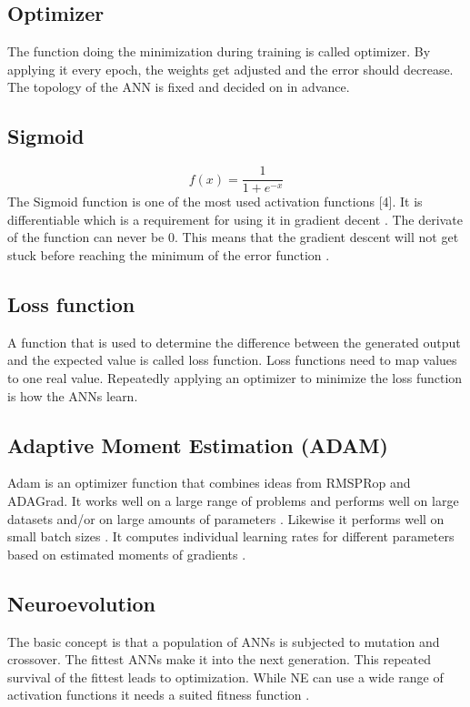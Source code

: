 \documentclass{llncs}
\begin{document}
\subsection{Optimizer}
%
The function doing the minimization during training is called optimizer. By applying it every epoch, the weights get adjusted and the error should decrease. The topology of the ANN is fixed and decided on in advance.
%
\subsection{Sigmoid}
%
$$ f (x) =  \frac{\mathrm{1} }{\mathrm{1} + e^{-x} }  $$ 
\newline
The Sigmoid function is one of the most used activation functions [4]. It is differentiable which is a requirement for using it in gradient decent \cite{Rojas.1996}. The derivate of the function can never be 0. This means that the gradient descent will not get stuck before reaching the minimum of the error function \cite{Rojas.1996}.  
%
\subsection{Loss function}
%
A function that is used to determine the difference between the generated output and the expected value is called loss function. Loss functions need to map values to one real value. Repeatedly applying an optimizer to minimize the loss function is how the ANNs learn.
%
\subsection{Adaptive Moment Estimation (ADAM)}
%
Adam is an optimizer function that combines ideas from RMSPRop and ADAGrad. It works well on a large range of problems and performs well on large datasets and/or on large amounts of parameters \cite{Kingma.22.12.2014}. Likewise it performs well on small batch sizes \cite{Kingma.22.12.2014}. It computes individual learning rates for different parameters based on estimated moments of gradients \cite{Kingma.22.12.2014}.
%
\subsection{Neuroevolution }
%
The basic concept is that a population of ANNs is subjected to mutation and crossover. The fittest ANNs make it into the next generation.  This repeated survival of the fittest leads to optimization. While NE can use a wide range of activation functions it needs a suited fitness function \cite{Stanley.2019}.
%
\end{document}
